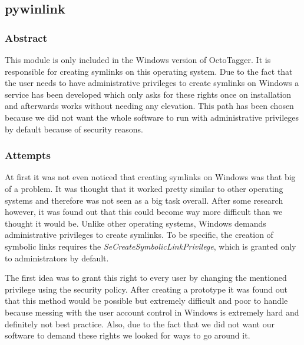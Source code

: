 \subsection{pywinlink}
\label{subsec:mod:pywinlink}
\def\kapitelautor{Christoph Führer, Clemens Stadlbauer}

\subsubsection{Abstract}

This module is only included in the Windows version of OctoTagger. It is responsible for creating symlinks on this operating system. Due to the fact that the user needs to have administrative privileges to create symlinks on Windows a service has been developed which only asks for these rights once on installation and afterwards works without needing any elevation. This path has been chosen because we did not want the whole software to run with administrative privileges by default because of security reasons. 

\subsubsection{Attempts}

At first it was not even noticed that creating symlinks on Windows was that big of a problem. It was thought that it worked pretty similar to other operating systems and therefore was not seen as a big task overall. After some research however, it was found out that this could become way more difficult than we thought it would be. Unlike other operating systems, Windows demands administrative privileges to create symlinks. To be specific, the creation of symbolic links requires the \textit{SeCreateSymbolicLinkPrivilege}, which is granted only to administrators by default. 

The first idea was to grant this right to every user by changing the mentioned privilege using the security policy. After creating a prototype it was found out that this method would be possible but extremely difficult and poor to handle because messing with the user account control in Windows is extremely hard and definitely not best practice. Also, due to the fact that we did not want our software to demand these rights we looked for ways to go around it. 

